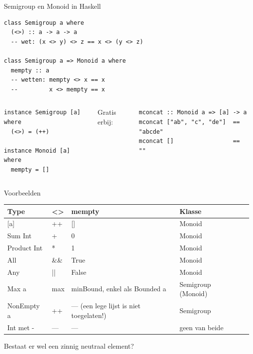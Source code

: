 \documentclass[aspectratio=169,11pt]{beamer}
\newcommand{\code}[1]{{\ttfamily\color{kuldonker}#1}}
\begin{document}
\begin{frame}[fragile]{Semigroup en Monoid in Haskell}
\begin{lstlisting}
class Semigroup a where
  (<>) :: a -> a -> a
  -- wet: (x <> y) <> z == x <> (y <> z)
 
class Semigroup a => Monoid a where
  mempty :: a
  -- wetten: mempty <> x == x
  --         x <> mempty == x
\end{lstlisting}
  \pause
  \begin{columns}[T]
\begin{lstlisting}
instance Semigroup [a] where
  (<>) = (++)
 
instance Monoid [a] where
  mempty = []
\end{lstlisting}
    Gratis erbij:
\begin{lstlisting}
mconcat :: Monoid a => [a] -> a
mconcat ["ab", "c", "de"]  == "abcde"
mconcat []                 == ""
\end{lstlisting}
  \end{columns}
\end{frame}
 
\begin{frame}{Voorbeelden}
  \centering
  \begin{tabular}{lllll}
    \toprule
    \textbf{Type} & \textbf{\code{<>}} & \textbf{\code{mempty}} & \textbf{Klasse} \\
    \midrule
    \code{[a]}         & \code{++}            & \code{[]}    & Monoid \\
    \code{Sum Int}     & \code{+}             & \code{0}     & Monoid \\
    \code{Product Int} & \code{*}             & \code{1}     & Monoid \\
    \code{All}         & \code{\&\&}          & \code{True}  & Monoid \\
    \code{Any}         & \code{||}            & \code{False} & Monoid \\
    \code{Max a}       & \code{max}           & \code{minBound}, enkel als \code{Bounded a} & Semigroup (Monoid) \\
    \code{NonEmpty a}  & \code{++}            & --- (een lege lijst is niet toegelaten!) & Semigroup \\
    \code{Int} met \code{-} & --- & --- & geen van beide \\
    \bottomrule
  \end{tabular}
 
  \vspace{10pt}
  Bestaat er wel een \alert{zinnig} neutraal element?
\end{frame}
 
\end{document}
